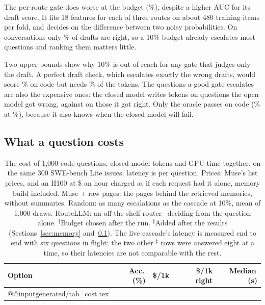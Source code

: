 \documentclass[10pt,twocolumn]{article}
\makeatletter
\newcommand{\rows}[1]{\csname @@input\endcsname generated/#1 }
\makeatother
\begin{document}
The per-route gate does worse at the budget (\perRouteSwe\%), despite a higher AUC for its draft score. It fits 18 features for each of three routes on about 480 training items per fold, and decides on the difference between two noisy probabilities. On conversations only \draftRightLoco\% of drafts are right, so a 10\% budget already escalates most questions and ranking them matters little.

Two upper bounds show why 10\% is out of reach for any gate that judges only the draft. A perfect draft check, which escalates exactly the wrong drafts, would score \perfectSwe\% on code but needs \perfectShareSwe\% of the tokens. The questions a good gate escalates are also the expensive ones: the closed model writes \escTokWrongSwe{} tokens on questions the open model got wrong, against \escTokRightSwe{} on those it got right. Only the oracle passes on code (\accSweOracle\% at \shareSweOracle\%), because it also knows when the closed model will fail.

\subsection{What a question costs}
\label{sec:cost}

\begin{table}[t]
\centering
\small
\setlength{\tabcolsep}{3pt}
\caption{The cost of 1{,}000 code questions, closed-model tokens and GPU time together, on the same 300 SWE-bench Lite issues; latency is per question. Prices: Muse's list prices, and an H100 at \$\hundredRate{} an hour charged as if each request had it alone, memory build included. Muse + raw pages: the pages behind the retrieved memories, without summaries. Random: as many escalations as the cascade at 10\%, mean of 1{,}000 draws. RouteLLM: an off-the-shelf router~\citep{ong2025routellm} deciding from the question alone. $^\dagger$Budget chosen after the run. $^\ddagger$Added after the results (Sections~\ref{sec:memory} and~\ref{sec:cost}). The live cascade's latency is measured end to end with six questions in flight; the two other $^\ddagger$ rows were answered eight at a time, so their latencies are not comparable with the rest.}
\label{tab:cost}
\begin{tabular}{lrrrr}
\toprule
Option & Acc.\,(\%) & \$/1k & \$/1k right & Median\,(s)\\
\midrule
\rows{tab_cost.tex}
\bottomrule
\end{tabular}
\end{table}
\end{document}
